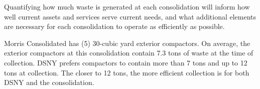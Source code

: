 
    Quantifying how much waste is generated at each consolidation will inform how well current assets and services serve current needs, and what additional elements are necessary for each consolidation to operate as efficiently as possible.
    
    Morris Consolidated has (5) 30-cubic yard exterior compactors. On average, the exterior compactors at this consolidation contain 7.3 tons of waste at the time of collection. DSNY prefers compactors to contain more than 7 tons and up to 12 tons at collection. The closer to 12 tons, the more efficient collection is for both DSNY and the consolidation.